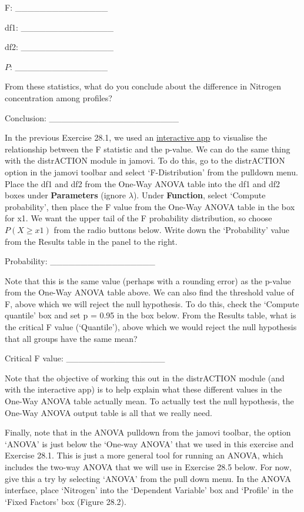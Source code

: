 \documentclass[
  openany]{scrbook}
\begin{document}
F: \_\_\_\_\_\_\_\_\_\_\_\_\_\_\_

df1: \_\_\_\_\_\_\_\_\_\_\_\_\_\_\_

df2: \_\_\_\_\_\_\_\_\_\_\_\_\_\_\_

\(P\): \_\_\_\_\_\_\_\_\_\_\_\_\_\_\_

From these statistics, what do you conclude about the difference in Nitrogen concentration among profiles?

Conclusion: \_\_\_\_\_\_\_\_\_\_\_\_\_\_\_\_\_\_\_\_\_

In the previous Exercise 28.1, we used an \href{https://bradduthie.shinyapps.io/f_distribution/}{interactive app} to visualise the relationship between the F statistic and the p-value.
We can do the same thing with the distrACTION module in jamovi.
To do this, go to the distrACTION option in the jamovi toolbar and select `F-Distribution' from the pulldown menu.
Place the df1 and df2 from the One-Way ANOVA table into the df1 and df2 boxes under \textbf{Parameters} (ignore \(\lambda\)).
Under \textbf{Function}, select `Compute probability', then place the F value from the One-Way ANOVA table in the box for x1.
We want the upper tail of the F probability distribution, so choose \(P(X \geq x1)\) from the radio buttons below.
Write down the `Probability' value from the Results table in the panel to the right.

Probability: \_\_\_\_\_\_\_\_\_\_\_\_\_\_\_\_\_

Note that this is the same value (perhaps with a rounding error) as the p-value from the One-Way ANOVA table above.
We can also find the threshold value of F, above which we will reject the null hypothesis.
To do this, check the `Compute quantile' box and set p = 0.95 in the box below.
From the Results table, what is the critical F value (`Quantile'), above which we would reject the null hypothesis that all groups have the same mean?

Critical F value: \_\_\_\_\_\_\_\_\_\_\_\_\_\_\_\_

Note that the objective of working this out in the distrACTION module (and with the interactive app) is to help explain what these different values in the One-Way ANOVA table actually mean.
To actually test the null hypothesis, the One-Way ANOVA output table is all that we really need.

Finally, note that in the ANOVA pulldown from the jamovi toolbar, the option `ANOVA' is just below the `One-way ANOVA' that we used in this exercise and Exercise 28.1.
This is just a more general tool for running an ANOVA, which includes the two-way ANOVA that we will use in Exercise 28.5 below.
For now, give this a try by selecting `ANOVA' from the pull down menu.
In the ANOVA interface, place `Nitrogen' into the `Dependent Variable' box and `Profile' in the `Fixed Factors' box (Figure 28.2).
\end{document}
